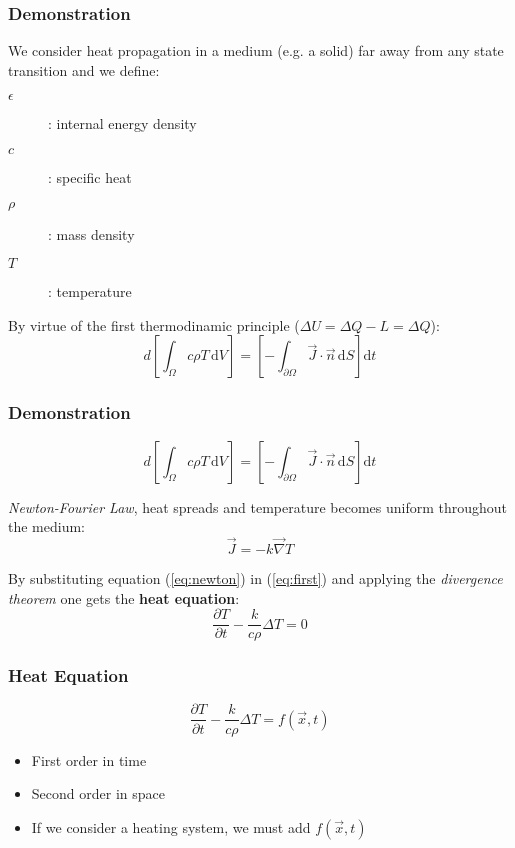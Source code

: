 \begin{frame}
\frametitle{Demonstration}
We consider heat propagation in a medium (e.g. a solid) far away from any state transition and we define:
\begin{description}
	\item[$\epsilon$]: internal energy density
	\item[$c$]: specific heat
	\item[$\rho$]: mass density
	\item[$T$]: temperature
\end{description}
By virtue of the first thermodinamic principle ($\Delta U = \Delta Q - L = \Delta Q$):
\begin{equation}\label{eq:first}
	d 
	\left[ 
		\int_\Omega 
		\! c \rho T  
		\, \mathrm{d}V
	\right]
	= 
	\left[
		- \int_{\partial \Omega} 
		\! \vec{J} \cdot \vec{n}
		\, \mathrm{d}S
	\right]
	\mathrm{d}t
\end{equation}
\end{frame}

\begin{frame}
\frametitle{Demonstration}
$$
	d 
	\left[ 
		\int_\Omega 
		\! c \rho T  
		\, \mathrm{d}V
	\right]
	= 
	\left[
		- \int_{\partial \Omega} 
		\! \vec{J} \cdot \vec{n}
		\, \mathrm{d}S
	\right]
	\mathrm{d}t
$$

{\it Newton-Fourier Law}, heat spreads and temperature becomes uniform throughout the medium:
\begin{equation}\label{eq:newton}
	\vec{J} = - k \vec{\nabla} T
\end{equation}

By substituting equation (\ref{eq:newton}) in (\ref{eq:first}) and applying the {\it divergence theorem} one gets the {\bf heat equation}:
\begin{equation}
	\frac
		{\partial T}
		{\partial t}
	- \frac{k}{c \rho}
	  \Delta T
	=0
\end{equation}
\end{frame}

\begin{frame}
\frametitle{Heat Equation}
$$
	\frac
		{\partial T}
		{\partial t}
	- \frac{k}{c \rho}
	  \Delta T
	= f(\vec{x}, t)
$$
\begin{itemize}
	\item First order in time
	\item Second order in space
	\item If we consider a heating system, we must add $f(\vec{x}, t)$
\end{itemize}
\end{frame}

